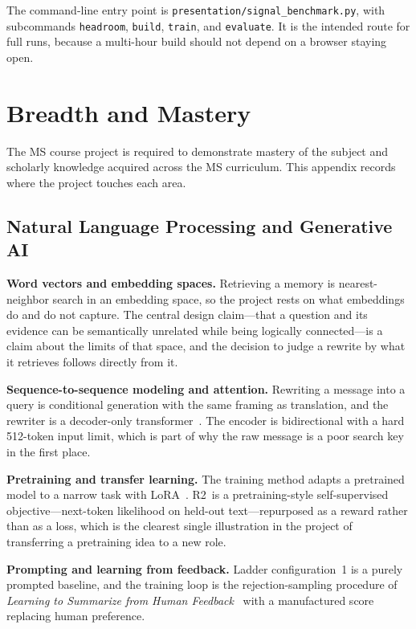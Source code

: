 \documentclass[12pt,letterpaper,oneside]{report}
\newcommand{\code}[1]{\texttt{\small #1}}
\newcommand{\Rb}{R2}
\begin{document}
The command-line entry point is \code{presentation/signal\_benchmark.py}, with
subcommands \code{headroom}, \code{build}, \code{train}, and \code{evaluate}.
It is the intended route for full runs, because a multi-hour build should not
depend on a browser staying open.

\chapter{Breadth and Mastery}
\label{app:mastery}

The MS course project is required to demonstrate mastery of the subject and
scholarly knowledge acquired across the MS curriculum. This appendix records
where the project touches each area.

\section{Natural Language Processing and Generative AI}

\textbf{Word vectors and embedding spaces.} Retrieving a memory is
nearest-neighbor search in an embedding space, so the project rests on what
embeddings do and do not capture. The central design claim---that a question
and its evidence can be semantically unrelated while being logically
connected---is a claim about the limits of that space, and the decision to
judge a rewrite by what it retrieves follows directly from it.

\textbf{Sequence-to-sequence modeling and attention.} Rewriting a message into
a query is conditional generation with the same framing as translation, and the
rewriter is a decoder-only transformer~\cite{transformer}. The encoder is
bidirectional with a hard 512-token input limit, which is part of why the raw
message is a poor search key in the first place.

\textbf{Pretraining and transfer learning.} The training method adapts a
pretrained model to a narrow task with LoRA~\cite{lora}. \Rb\ is a
pretraining-style self-supervised objective---next-token likelihood on held-out
text---repurposed as a reward rather than as a loss, which is the clearest
single illustration in the project of transferring a pretraining idea to a new
role.

\textbf{Prompting and learning from feedback.} Ladder configuration~1 is a
purely prompted baseline, and the training loop is the rejection-sampling
procedure of \emph{Learning to Summarize from Human Feedback}~\cite{summarize}
with a manufactured score replacing human preference.
\end{document}
